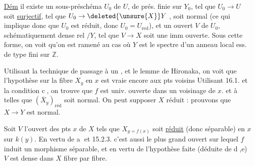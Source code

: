 \uline{Dém}  il existe
un sous-préschéma $U_0$  de $U$, de prés. finie sur $Y_0$,
tel que $U_0\to U$ soit \uline{surjectif},  tel que
$U_0\to\deleted{\unsure{X}}Y$ , soit  normal 
(ce qui implique donc que $U_0$ est réduit, donc $U_0=U_{\text{red}}$), et un ouvert
$V$ de $U_0$, schématiquement dense rel $/Y$, tel que
$V\longrightarrow X$ soit une imm ouverte. Sous cette
forme, on voit qu'on est ramené au cas
où $Y$ est le spectre d'un anneau local ess.
de type fini sur $\mathbb Z$.

Utilisant la technique  de passage à un ,
et le lemme de Hironaka, on voit que l'hypothèse sur la fibre $X_y$ en $x$ est vraie encore aux
pts voisins  Utilisant  16.1.  et la 
condition \textcircled{c}, on trouve que $f$ est univ. ouverte  dans
un voisinage de $x$. 
et à  telles que $(\overline X_y)_{\text{réd}}$ soit normal.  On
 peut supposer $X$ réduit : prouvons que
$X\to Y$ est normal.

Soit $V$ l'ouvert des pts $x$ de $X$ tels que $X_{y=f(x)}$ soit
\uline{réduit} (donc séparable) en $x$ sur $k(y)$. En vertu de \textcircled{a} et
 15.2.3. c'est aussi le plus grand ouvert sur lequel
$f$ induit un morphisme  séparable, et en
vertu de l'hypothèse faite (déduite de \textcircled{d,e}) $V$ est
dense dans $X$ fibre par fibre. 

